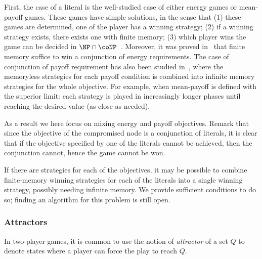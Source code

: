 First, the case of a literal is the well-studied case of either energy games or mean-payoff games.
These games have simple solutions, in the sense that (1) these games are determined, \ie one of the player has a winning strategy; (2) if a winning strategy exists, there exists one with finite memory; (3) which player wins the game can be decided in $\NP\cap \coNP$~\cite{zwick96}.
Moreover, it was proved in~\cite{velner12a} that finite memory suffice to win a conjunction of energy requirements.
The case of conjunction of payoff requirement has also been studied in~\cite{velner12a}, where the memoryless strategies for each payoff condition is combined into infinite memory strategies for the whole objective.
For example, when mean-payoff is defined with the superior limit: each strategy is played in increasingly longer phases until reaching the desired value (as close as needed).

As a result we here focus on mixing energy and payoff objectives.
Remark that since the objective of the compromised node is a conjunction of literals, it is clear that if the objective specified by one of the literals cannot be achieved, then the conjunction cannot, hence the game cannot be won.

If there are strategies for each of the objectives, it may be possible to combine finite-memory winning strategies for each of the literals into a single winning strategy, possibly needing infinite memory.
We provide sufficient conditions to do so; finding an algorithm for this problem is still open.

\subsubsection{Attractors}

In two-player games, it is common to use the notion of \emph{attractor} of a set $Q$ to denote states where a player can force the play to reach $Q$.

